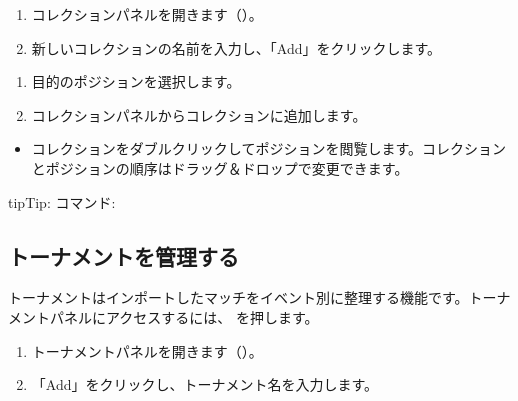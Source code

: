 \documentclass[letterpaper,10pt,dvipdfmx]{sphinxmanual}
\begin{document}
\sphinxAtStartPar
{}
\begin{enumerate}
%
\item {} 
\sphinxAtStartPar
コレクションパネルを開きます（）。

\item {} 
\sphinxAtStartPar
新しいコレクションの名前を入力し、「Add」をクリックします。

\end{enumerate}

\sphinxAtStartPar
{}
\begin{enumerate}
%
\item {} 
\sphinxAtStartPar
目的のポジションを選択します。

\item {} 
\sphinxAtStartPar
コレクションパネルからコレクションに追加します。

\end{enumerate}

\sphinxAtStartPar
{}
\begin{itemize}
\item {} 
\sphinxAtStartPar
コレクションをダブルクリックしてポジションを閲覧します。コレクションとポジションの順序はドラッグ＆ドロップで変更できます。

\end{itemize}

\begin{sphinxadmonition}{tip}{Tip:}
\sphinxAtStartPar
コマンド: 
\end{sphinxadmonition}


\subsection{トーナメントを管理する}
\label{\detokenize{guide_utilisateur:gerer-les-tournois}}
\sphinxAtStartPar
トーナメントはインポートしたマッチをイベント別に整理する機能です。トーナメントパネルにアクセスするには、 を押します。

\sphinxAtStartPar
{}
\begin{enumerate}
%
\item {} 
\sphinxAtStartPar
トーナメントパネルを開きます（）。

\item {} 
\sphinxAtStartPar
「Add」をクリックし、トーナメント名を入力します。

\end{enumerate}
\end{document}
